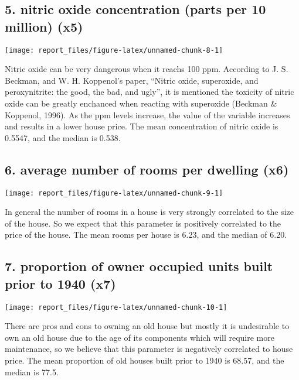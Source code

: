 \documentclass[]{article}
\begin{document}
\subsection{5. nitric oxide concentration (parts per 10 million)
(x5)}\label{nitric-oxide-concentration-parts-per-10-million-x5}

\begin{center}\texttt{[image: report\_files/figure-latex/unnamed-chunk-8-1]} \end{center}

Nitric oxide can be very dangerous when it reachs 100 ppm. According to
J. S. Beckman, and W. H. Koppenol's paper, ``Nitric oxide, superoxide,
and peroxynitrite: the good, the bad, and ugly'', it is mentioned the
toxicity of nitric oxide can be greatly enchanced when reacting with
superoxide (Beckman \& Koppenol, 1996). As the ppm levels increase, the
value of the variable increases and results in a lower house price. The
mean concentration of nitric oxide is 0.5547, and the median is 0.538.

\subsection{6. average number of rooms per dwelling
(x6)}\label{average-number-of-rooms-per-dwelling-x6}

\begin{center}\texttt{[image: report\_files/figure-latex/unnamed-chunk-9-1]} \end{center}

In general the number of rooms in a house is very strongly correlated to
the size of the house. So we expect that this parameter is positively
correlated to the price of the house. The mean rooms per house is 6.23,
and the median of 6.20.

\subsection{7. proportion of owner occupied units built prior to 1940
(x7)}\label{proportion-of-owner-occupied-units-built-prior-to-1940-x7}

\begin{center}\texttt{[image: report\_files/figure-latex/unnamed-chunk-10-1]} \end{center}

There are pros and cons to owning an old house but mostly it is
undesirable to own an old house due to the age of its components which
will require more maintenance, so we believe that this parameter is
negatively correlated to house price. The mean proportion of old houses
built prior to 1940 is 68.57, and the median is 77.5.
\end{document}
